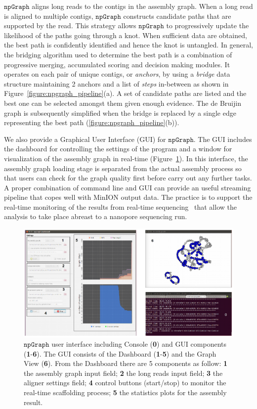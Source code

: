 \documentclass[10pt,letterpaper]{article}
\newcommand{\npgraph}{$\mathtt{npGraph}$}
\begin{document}
\npgraph{} aligns long reads to the contigs in the assembly graph. When a long read is aligned
to multiple contigs, \npgraph{} constructs candidate paths that are supported by the read. This strategy allows \npgraph{} to progressively update the likelihood of the paths going through a knot.
When sufficient data are obtained, the best path is confidently identified and hence the knot is untangled.
In general, the bridging algorithm used to determine the best path is a combination of progressive merging, accumulated scoring and decision making modules.
It operates on each pair of unique contigs, or \emph{anchors}, by using a \emph{bridge} data structure maintaining 2 anchors and a list of \emph{steps} in-between as shown in Figure~\ref{figure:npgraph_pipeline}(a). 
A set of candidate paths are listed and the best one can be selected amongst them given enough evidence. 
The de Bruijin graph is subsequently simplified when the bridge is replaced by a single edge representing the best path (\ref{figure:npgraph_pipeline}(b)).


We also provide a Graphical User Interface (GUI) for \npgraph{}. The GUI includes the dashboard for controlling the settings of the program and a window for visualization of the assembly graph 
in real-time (Figure~\ref{figure:npgraph_gui}). 
In this interface, the assembly graph loading stage is separated from the actual assembly process so that users can check for the graph quality first before carry out any further tasks.
A proper combination of command line and GUI can provide an useful streaming pipeline that copes well with MinION output data. The practice is to support the real-time monitoring of
the results from real-time sequencing~\cite{CaoGC2016,Cao2017scaffolding,Nguyen2017barcode} that allow the analysis to take place abreast to a nanopore sequencing run.

\begin{figure}[!hpt]
\centering
\includegraphics[width=\textwidth]{images/Fig2.eps}
\caption{\npgraph{} user interface including Console (\textbf{0}) and GUI components (\textbf{1}-\textbf{6}). The GUI consists of the Dashboard (\textbf{1}-\textbf{5}) and the Graph View (\textbf{6}). From the Dashboard there are 5 components as follow: \textbf{1} the assembly graph input field; \textbf{2} the long reads input field; \textbf{3} the aligner settings field; \textbf{4} control buttons (start/stop) to monitor the real-time scaffolding process; \textbf{5} the statistics plots for the assembly result.}
\label{figure:npgraph_gui}
\end{figure}
\end{document}
